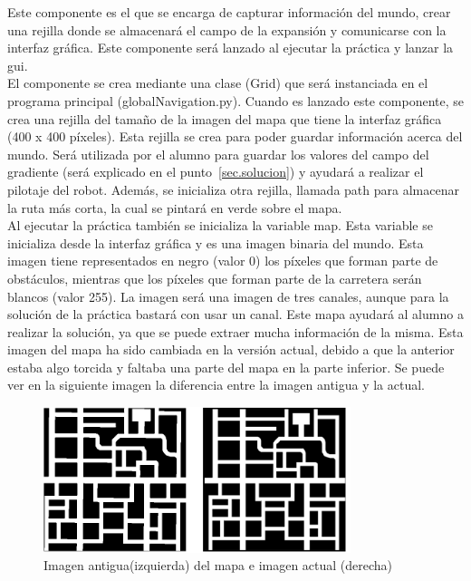 Este componente es el que se encarga de capturar información del mundo, crear una rejilla donde se almacenará el campo de la expansión y comunicarse con la interfaz gráfica. Este componente será lanzado al ejecutar la práctica y lanzar la \acrshort{gui}.\\

El componente se crea mediante una clase (Grid) que será instanciada en el programa principal (globalNavigation.py). Cuando es lanzado este componente, se crea una rejilla del tamaño de la imagen del mapa que tiene la interfaz gráfica (400 x 400 píxeles). Esta rejilla se crea para poder guardar información acerca del mundo. Será utilizada por el alumno para guardar los valores del campo del gradiente (será explicado en el punto~\ref{sec.solucion}) y ayudará a realizar el pilotaje del robot. Además, se inicializa otra rejilla, llamada path para almacenar la ruta más corta, la cual se pintará en verde sobre el mapa.\\

Al ejecutar la práctica también se inicializa la variable map. Esta variable se inicializa desde la interfaz gráfica y es una imagen binaria del mundo. Esta imagen tiene representados en negro (valor 0) los píxeles que forman parte de obstáculos, mientras que los píxeles que forman parte de la carretera serán blancos (valor 255). La imagen será una imagen de tres canales, aunque para la solución de la práctica bastará con usar un canal. Este mapa ayudará al alumno a realizar la solución, ya que se puede extraer mucha información de la misma. Esta imagen del mapa ha sido cambiada en la versión actual, debido a que la anterior estaba algo torcida y faltaba una parte del mapa en la parte inferior. Se puede ver en la siguiente imagen la diferencia entre la imagen antigua y la actual.

\begin{figure}[H]
  \begin{center}
    \includegraphics[width=0.8\textwidth]{figures/GPP/imagenes_Mapa.png}
		\caption{Imagen antigua(izquierda) del mapa e imagen actual (derecha)}
		\label{fig.imag_mapa}
		\end{center}
\end{figure}

